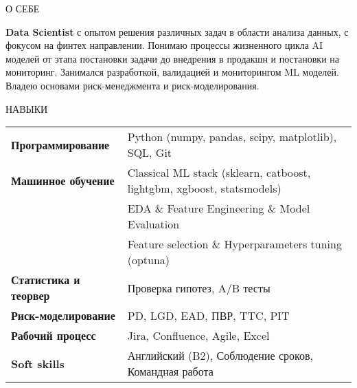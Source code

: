 \documentclass{resume} %
\begin{document}
\large
\begin{rSection}{О СЕБЕ} %

{\textbf{Data Scientist} с опытом решения различных задач в области анализа данных, с фокусом на финтех направлении. Понимаю процессы жизненного цикла AI моделей от этапа постановки задачи до внедрения в продакшн и постановки на мониторинг. Занимался разработкой, валидацией и мониторингом ML моделей. Владею основами риск-менеджмента и риск-моделирования.} %

\end{rSection}

\begin{rSection}{НАВЫКИ} %

\begin{tabular}{ @{} >{\bfseries}l @{\hspace{3ex}} p{} }
Программирование & Python (numpy, pandas, scipy, matplotlib), SQL, Git %
\\
Машинное обучение
& Classical ML stack (sklearn, catboost, lightgbm, xgboost, statsmodels)
\\
&  EDA \& Feature Engineering \& Model Evaluation%
\\
& Feature selection \& Hyperparameters tuning (optuna) %
\\
Статистика и теорвер & Проверка гипотез, A/B тесты %
\\
Риск-моделирование & PD, LGD, EAD, ПВР, TTC, PIT %
\\
Рабочий процесс & Jira, Confluence, Agile, Excel %
\\
Soft skills & Английский (B2), Соблюдение сроков, Командная работа %
\\
\end{tabular}\\

\end{rSection}
\end{document}
